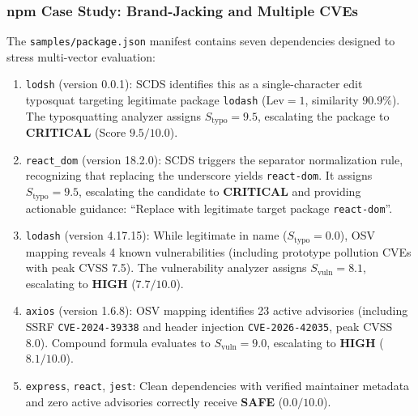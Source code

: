 \subsubsection{npm Case Study: Brand-Jacking and Multiple CVEs}
The \texttt{samples/package.json} manifest contains seven dependencies designed to stress multi-vector evaluation:
\begin{enumerate}
    \item \texttt{lodsh} (version 0.0.1): SCDS identifies this as a single-character edit typosquat targeting legitimate package \texttt{lodash} ($\text{Lev} = 1$, similarity $90.9\%$). The typosquatting analyzer assigns $S_{\text{typo}} = 9.5$, escalating the package to \textbf{CRITICAL} (Score $9.5/10.0$).
    \item \texttt{react\_dom} (version 18.2.0): SCDS triggers the separator normalization rule, recognizing that replacing the underscore yields \texttt{react-dom}. It assigns $S_{\text{typo}} = 9.5$, escalating the candidate to \textbf{CRITICAL} and providing actionable guidance: ``Replace with legitimate target package \texttt{react-dom}''.
    \item \texttt{lodash} (version 4.17.15): While legitimate in name ($S_{\text{typo}} = 0.0$), OSV mapping reveals 4 known vulnerabilities (including prototype pollution CVEs with peak CVSS 7.5). The vulnerability analyzer assigns $S_{\text{vuln}} = 8.1$, escalating to \textbf{HIGH} ($7.7/10.0$).
    \item \texttt{axios} (version 1.6.8): OSV mapping identifies 23 active advisories (including SSRF \texttt{CVE-2024-39338} and header injection \texttt{CVE-2026-42035}, peak CVSS 8.0). Compound formula evaluates to $S_{\text{vuln}} = 9.0$, escalating to \textbf{HIGH} ($8.1/10.0$).
    \item \texttt{express}, \texttt{react}, \texttt{jest}: Clean dependencies with verified maintainer metadata and zero active advisories correctly receive \textbf{SAFE} ($0.0/10.0$).
\end{enumerate}

